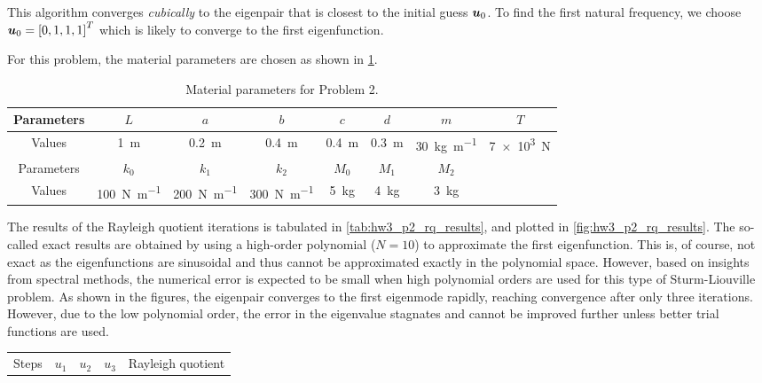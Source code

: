 \begin{enumerate}[(i)]
{    This algorithm converges \emph{cubically} to the eigenpair that is closest to the initial guess $\bm{u}_0$.
    To find the first natural frequency, we choose $\bm{u}_0 = {[0, 1, 1, 1]}^T$ which is likely to converge to the first eigenfunction.

    For this problem, the material parameters are chosen as shown in \cref{tab:hw3_p2_params}.
    \begin{table}[!ht]
        \centering
        \begin{tabular}{|c|c|c|c|c|c|c|c|}
            \hline
            Parameters & $L$ & $a$ & $b$ & $c$ & $d$ & $m$ & $T$ \\
            \hline
            Values & \qty{1}{\m} & \qty{0.2}{\m} & \qty{0.4}{\m} & \qty{0.4}{\m} & \qty{0.3}{\m} & \qty{30}{\kg\per\m} & \qty{7e3}{\newton} \\
            \hline
            Parameters & $k_0$ & $k_1$ & $k_2$ & $M_0$ & $M_1$ & $M_2$ & \\
            \hline 
            Values & \qty{100}{\newton\per\m} & \qty{200}{\newton\per\m} & \qty{300}{\newton\per\m} & \qty{5}{\kg} & \qty{4}{\kg} & \qty{3}{\kg} &  \\
            \hline
        \end{tabular}
        \caption{Material parameters for Problem 2. }
        \label{tab:hw3_p2_params}
    \end{table}
    The results of the Rayleigh quotient iterations is tabulated in \cref{tab:hw3_p2_rq_results}, and plotted in \cref{fig:hw3_p2_rq_results}.
    The so-called exact results are obtained by using a high-order polynomial ($N = 10$) to approximate the first eigenfunction. 
    This is, of course, not exact as the eigenfunctions are sinusoidal and thus cannot be approximated exactly in the polynomial space. 
    However, based on insights from spectral methods, the numerical error is expected to be small when high polynomial orders are used for this type of Sturm-Liouville problem. 
    As shown in the figures, the eigenpair converges to the first eigenmode rapidly, reaching convergence after only three iterations. 
    However, due to the low polynomial order, the error in the eigenvalue stagnates and cannot be improved further unless better trial functions are used. 
    \begin{table}[!ht]
        \centering
        \begin{tabular}{|c|c|c|c|c|}
            \hline
            Steps & $u_1$ & $u_2$ & $u_3$ & Rayleigh quotient \\

\end{tabular}
\end{table}}
\end{enumerate}
